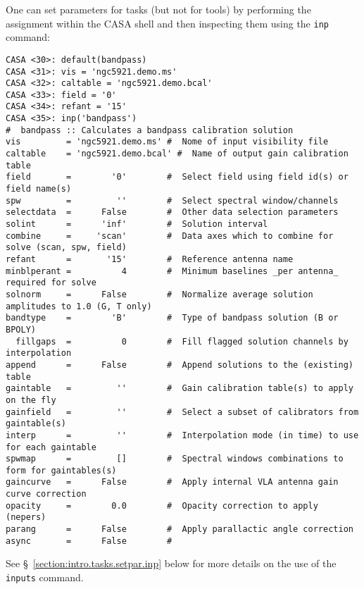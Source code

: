 One can set parameters for tasks (but not for tools) by
performing the assignment within the CASA shell and then inspecting
them using the {\tt inp} command:
\small
\begin{verbatim}
CASA <30>: default(bandpass)
CASA <31>: vis = 'ngc5921.demo.ms'
CASA <32>: caltable = 'ngc5921.demo.bcal'
CASA <33>: field = '0'
CASA <34>: refant = '15'
CASA <35>: inp('bandpass')
#  bandpass :: Calculates a bandpass calibration solution
vis         = 'ngc5921.demo.ms' #  Nome of input visibility file
caltable    = 'ngc5921.demo.bcal' #  Name of output gain calibration table
field       =        '0'        #  Select field using field id(s) or field name(s)
spw         =         ''        #  Select spectral window/channels
selectdata  =      False        #  Other data selection parameters
solint      =      'inf'        #  Solution interval
combine     =     'scan'        #  Data axes which to combine for solve (scan, spw, field)
refant      =       '15'        #  Reference antenna name
minblperant =          4        #  Minimum baselines _per antenna_ required for solve
solnorm     =      False        #  Normalize average solution amplitudes to 1.0 (G, T only)
bandtype    =        'B'        #  Type of bandpass solution (B or BPOLY)
  fillgaps  =          0        #  Fill flagged solution channels by interpolation
append      =      False        #  Append solutions to the (existing) table
gaintable   =         ''        #  Gain calibration table(s) to apply on the fly
gainfield   =         ''        #  Select a subset of calibrators from gaintable(s)
interp      =         ''        #  Interpolation mode (in time) to use for each gaintable
spwmap      =         []        #  Spectral windows combinations to form for gaintables(s)
gaincurve   =      False        #  Apply internal VLA antenna gain curve correction
opacity     =        0.0        #  Opacity correction to apply (nepers)
parang      =      False        #  Apply parallactic angle correction
async       =      False        #  
\end{verbatim}
\normalsize
See \S~\ref{section:intro.tasks.setpar.inp} below for more details on
the use of the {\tt inputs} command.


